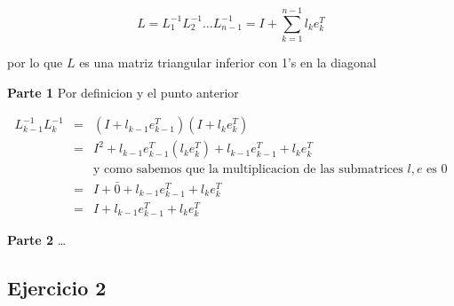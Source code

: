 \documentclass[11pt]{article}
\begin{document}
\begin{equation*} L = L^{-1}_1 L^{-1}_2 \dots L^{-1}_{n-1} = I + \sum_{k=1}^{n-1}l_ke_k^T
\end{equation*}

por lo que \(L\) es una matriz triangular inferior con 1's en la
diagonal

    \textbf{Parte 1} Por definicion y el punto anterior

\begin{eqnarray*}
    L_{k-1}^{-1}L_{k}^{-1} &=& (I + l_{k-1}e_{k-1}^T)(I + l_ke_k^T) \\
        &=& I^2 + l_{k-1}e_{k-1}^T(l_ke_k^T) + l_{k-1}e_{k-1}^T + l_ke_k^T \\
        &&\text{y como sabemos que la multiplicacion de las submatrices $l,e$ es 0} \\
        &=& I + \bar{0} + l_{k-1}e_{k-1}^T + l_ke_k^T \\
        &=& I + l_{k-1}e_{k-1}^T + l_ke_k^T 
\end{eqnarray*}

\textbf{Parte 2} \ldots{}















\newpage
    \hypertarget{ejercicio-2}{%
\subsection{Ejercicio 2}\label{ejercicio-2}}
\end{document}
